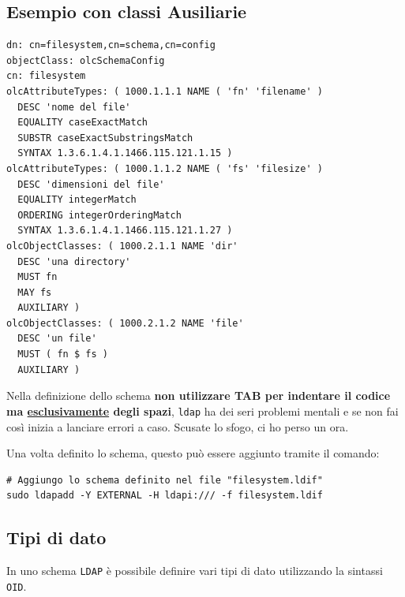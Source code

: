 \documentclass[a4paper]{report}
\newenvironment{ricordati}{\begin{tcolorbox}[fonttitle=\sffamily\bfseries\large,title=Ricordati,colframe=orange!75!white]}{\end{tcolorbox}}
\newenvironment{code}{\begin{tcolorbox}[size=small]}{\end{tcolorbox}}
\begin{document}
\subsection{Esempio con classi Ausiliarie}

\begin{code}
\begin{lstlisting}
dn: cn=filesystem,cn=schema,cn=config
objectClass: olcSchemaConfig
cn: filesystem
olcAttributeTypes: ( 1000.1.1.1 NAME ( 'fn' 'filename' )
  DESC 'nome del file'
  EQUALITY caseExactMatch
  SUBSTR caseExactSubstringsMatch
  SYNTAX 1.3.6.1.4.1.1466.115.121.1.15 )
olcAttributeTypes: ( 1000.1.1.2 NAME ( 'fs' 'filesize' )
  DESC 'dimensioni del file'
  EQUALITY integerMatch
  ORDERING integerOrderingMatch
  SYNTAX 1.3.6.1.4.1.1466.115.121.1.27 )
olcObjectClasses: ( 1000.2.1.1 NAME 'dir'
  DESC 'una directory'
  MUST fn
  MAY fs
  AUXILIARY )
olcObjectClasses: ( 1000.2.1.2 NAME 'file'
  DESC 'un file'
  MUST ( fn $ fs )
  AUXILIARY )
\end{lstlisting}
\end{code}



\begin{ricordati}
	Nella definizione dello schema \textbf{non utilizzare TAB per indentare il codice ma \underline{esclusivamente} degli spazi}, \texttt{ldap} ha dei seri problemi mentali e se non fai così inizia a lanciare errori a caso. Scusate lo sfogo, ci ho perso un ora.
\end{ricordati}

Una volta definito lo schema, questo può essere aggiunto tramite il comando:

\begin{code}
\begin{lstlisting}
# Aggiungo lo schema definito nel file "filesystem.ldif"
sudo ldapadd -Y EXTERNAL -H ldapi:/// -f filesystem.ldif 
\end{lstlisting}
\end{code}

\subsection{Tipi di dato}

In uno schema \texttt{LDAP} è possibile definire vari tipi di dato utilizzando la sintassi \texttt{OID}.
\end{document}
